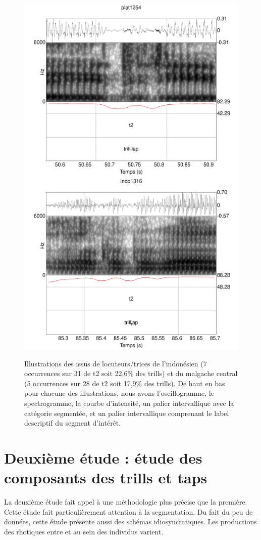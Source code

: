 \begin{figure}
	\centering
	\includegraphics[width=0.45\linewidth]{substance/spectro_images/plat1254_1457_34}
	\includegraphics[width=0.45\linewidth]{substance/spectro_images/indo1316_858_34}
	\caption[Illustrations des  issus de locuteurs/trices]{Illustrations des  issus de locuteurs/trices
		de l'indonésien  (7 occurrences sur 31 de t2 soit 22,6\% des trills) et 
		du malgache central  (5 occurrences sur 28 de t2 soit 17,9\% des trills). De haut en bas pour chacune des illustrations, nous avons l'oscillogramme, le spectrogramme, la courbe d'intensité, un palier intervallique avec la catégorie segmentée, et un palier intervallique comprenant le label descriptif du segment d'intérêt.}
	\label{fig:platindo}
\end{figure}


\section{Deuxième étude : étude des composants des trills et taps}

La deuxième étude fait appel à une méthodologie plus précise que la première. Cette étude fait particulièrement attention à la segmentation. Du fait du peu de données, cette étude présente aussi des schémas idiosyncratiques. Les productions des rhotiques entre et au sein des individus varient.\\

